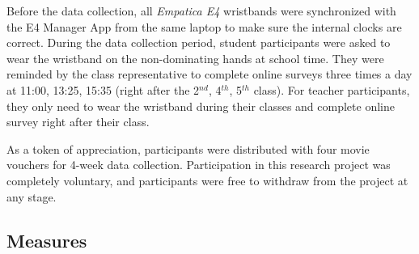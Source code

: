 \documentclass[sigconf]{acmart}
\begin{document}
Before the data collection, all \textit{Empatica E4} wristbands  were synchronized with the E4 Manager App from the same laptop to make sure the internal clocks are correct. During the data collection period, student participants were asked to wear the wristband on the non-dominating hands at school time. They were reminded by the class representative to complete online surveys three times a day at 11:00, 13:25, 15:35 (right after the 2$^{nd}$, 4$^{th}$, 5$^{th}$ class). For teacher participants, they only need to wear the wristband during their classes and complete online survey right after their class. 

As a token of appreciation, participants were distributed with four movie vouchers for 4-week data collection. Participation in this research project was completely voluntary, and participants were free to withdraw from the project at any stage.
\subsection{Measures}
\end{document}
